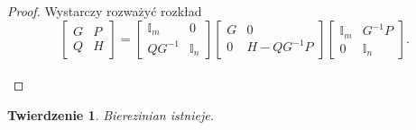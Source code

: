 \documentclass[11pt,a4paper]{report}
\newtheorem{theorem}{Twierdzenie}[section]
\theoremstyle{definition}
\newcommand{\I}{\mathbb{I}}
\begin{document}
\begin{proof}
	Wystarczy rozważyć rozkład
	\begin{equation*}
		\begin{bmatrix}
			G & P \\
			Q & H 
		\end{bmatrix}
		=
		\begin{bmatrix}
			\I_m    & 0    \\
			QG^{-1} & \I_n 
		\end{bmatrix}
		\begin{bmatrix}
			G & 0          \\
			0 & H-QG^{-1}P 
		\end{bmatrix}
		\begin{bmatrix}
			\I_m & G^{-1}P \\
			0    & \I_n    
		\end{bmatrix}\!\!.
	\end{equation*} \\[-24pt]
\end{proof}
\begin{theorem}
	Bierezinian istnieje.
\end{theorem}
\end{document}
